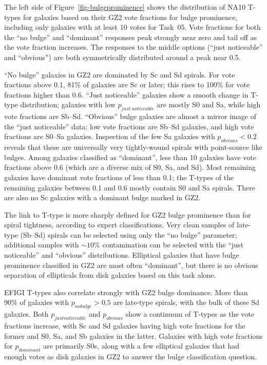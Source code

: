 \documentclass[useAMS,usenatbib]{mn2e}
\begin{document}
The left side of Figure~\ref{fig-bulgeprominence} shows the distribution of NA10 T-types for galaxies based on their GZ2 vote fractions for bulge prominence, including only galaxies with at least 10 votes for Task~05. Vote fractions for both the ``no bulge'' and ``dominant'' responses peak strongly near zero and tail off as the vote fraction increases. The responses to the middle options (``just noticeable'' and ``obvious'') are both symmetrically distributed around a peak near 0.5. 

``No bulge'' galaxies in GZ2 are dominated by Sc and Sd spirals. For vote fractions above 0.1, 81\% of galaxies are Sc or later; this rises to 100\% for vote fractions higher than 0.6. ``Just noticeable'' galaxies show a smooth change in T-type distribution; galaxies with low $p_{just~noticeable}$ are mostly S0 and Sa, while high vote fractions are Sb--Sd. ``Obvious'' bulge galaxies are almost a mirror image of the ``just noticeable'' data; low vote fractions are Sb--Sd galaxies, and high vote fractions are S0--Sa galaxies. Inspection of the few Sa galaxies with $p_{obvious}<0.2$ reveals that these are universally very tightly-wound spirals with point-source like bulges. Among galaxies classified as ``dominant'', less than 10 galaxies have vote fractions above 0.6 (which are a diverse mix of S0, Sa, and Sd). Most remaining galaxies have dominant vote fractions of less than 0.1; the T-types of the remaining galaxies between 0.1 and 0.6 mostly contain S0 and Sa spirals. There are also no Sc galaxies with a dominant bulge marked in GZ2. 

The link to T-type is more sharply defined for GZ2 bulge prominence than for spiral tightness, according to expert classifications. Very clean samples of late-type (Sb--Sd) spirals can be selected using only the ``no bulge'' parameter; additional samples with $\sim10$\% contamination can be selected with the ``just noticeable'' and ``obvious'' distributions. Elliptical galaxies that have bulge prominence classified in GZ2 are most often ``dominant'', but there is no obvious separation of ellipticals from disk galaxies based on this task alone. 

EFIGI T-types also correlate strongly with GZ2 bulge dominance. More than 90\% of galaxies with $p_{no bulge}>0.5$ are late-type spirals, with the bulk of these Sd galaxies. Both $p_{just noticeable}$ and $p_{obvious}$ show a continuum of T-types as the vote fractions increase, with Sc and Sd galaxies having high vote fractions for the former and S0, Sa, and Sb galaxies in the latter. Galaxies with high vote fractions for $p_{dominant}$ are primarily S0s, along with a few elliptical galaxies that had enough votes as disk galaxies in GZ2 to answer the bulge classification question. 
\end{document}
